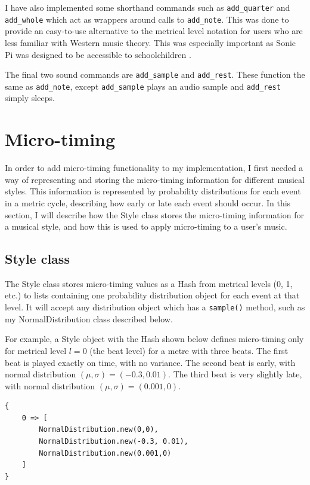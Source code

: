 \documentclass[12pt,twoside,openright]{report}
\begin{document}
I have also implemented some shorthand commands such as \verb'add_quarter' and
\verb'add_whole' which act as wrappers around calls to \verb'add_note'. This was done to
provide an easy-to-use alternative to the metrical level notation for users who
are less familiar with Western music theory. This was especially important as
Sonic Pi was designed to be accessible to schoolchildren \cite{aaron2013}.

The final two sound commands are \verb'add_sample' and \verb'add_rest'. These function the
same as \verb'add_note', except \verb'add_sample' plays an audio sample and \verb'add_rest' simply sleeps.



\section{Micro-timing} \label{micro-timing_implementation}

In order to add micro-timing functionality to my implementation, I first needed
a way of representing and storing the micro-timing information for different
musical styles. This information is represented by probability distributions for
each event in a metric cycle, describing how early or late each event should
occur. In this section, I will describe how the
Style class stores the micro-timing information for a musical style, and how
this is used to apply micro-timing to a user's music.


\subsection{Style class} \label{style_class}

The Style class stores micro-timing values as a Hash from metrical levels (0, 1,
etc.) to lists containing one probability distribution object for each event at
that level. It will accept any distribution object which has a \verb'sample()' method,
such as my NormalDistribution class described below.

For example, a Style object with the Hash shown below defines micro-timing only for metrical level
$l=0$ (the beat level) for a metre with three beats. The first beat is played exactly on time,
with no variance. The second beat is early, with normal distribution $(\mu,\sigma)=(-0.3,0.01)$.
The third beat is very slightly late, with normal distribution $(\mu,\sigma)=(0.001,0)$.

\begin{verbatim}
{
    0 => [
        NormalDistribution.new(0,0),
        NormalDistribution.new(-0.3, 0.01),
        NormalDistribution.new(0.001,0)
    ]
}
\end{verbatim}
\end{document}
